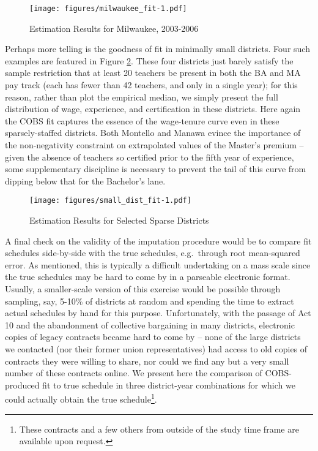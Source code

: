 \documentclass[12pt,]{article}
\let\rmarkdownfootnote\footnote%
\def\footnote{\protect\rmarkdownfootnote}
\begin{document}
\begin{figure}[htbp]
\centering
\texttt{[image: figures/milwaukee\_fit-1.pdf]}
\caption{\label{fig:mwk_fit}Estimation Results for Milwaukee, 2003-2006}
\end{figure}

Perhaps more telling is the goodness of fit in minimally small
districts. Four such examples are featured in Figure
\ref{fig:small_fit}. These four districts just barely satisfy the sample
restriction that at least 20 teachers be present in both the BA and MA
pay track (each has fewer than 42 teachers, and only in a single year);
for this reason, rather than plot the empirical median, we simply
present the full distribution of wage, experience, and certification in
these districts. Here again the COBS fit captures the essence of the
wage-tenure curve even in these sparsely-staffed districts. Both
Montello and Manawa evince the importance of the non-negativity
constraint on extrapolated values of the Master's premium -- given the
absence of teachers so certified prior to the fifth year of experience,
some supplementary discipline is necessary to prevent the tail of this
curve from dipping below that for the Bachelor's lane.

\begin{figure}[htbp]
\centering
\texttt{[image: figures/small\_dist\_fit-1.pdf]}
\caption{\label{fig:small_fit}Estimation Results for Selected Sparse
Districts}
\end{figure}

A final check on the validity of the imputation procedure would be to
compare fit schedules side-by-side with the true schedules, e.g.~through
root mean-squared error. As mentioned, this is typically a difficult
undertaking on a mass scale since the true schedules may be hard to come
by in a parseable electronic format. Usually, a smaller-scale version of
this exercise would be possible through sampling, say, 5-10\% of
districts at random and spending the time to extract actual schedules by
hand for this purpose. Unfortunately, with the passage of Act 10 and the
abandonment of collective bargaining in many districts, electronic
copies of legacy contracts became hard to come by -- none of the large
districts we contacted (nor their former union representatives) had
access to old copies of contracts they were willing to share, nor could
we find any but a very small number of these contracts online. We
present here the comparison of COBS-produced fit to true schedule in
three district-year combinations for which we could actually obtain the
true schedule\footnote{These contracts and a few others from outside of
  the study time frame are available upon request.}.
\end{document}
